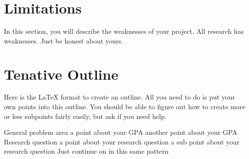 \documentclass{turabian-researchpaper}
\begin{document}
\section{Limitations}
In this section, you will describe the weaknesses of your project. All research has weaknesses. Just be honest about yours.

\section{Tenative Outline}
Here is the \LaTeX{} format to create an outline. All you need to do is put your own points into this outline. You should be able to figure out how to create more or less subpoints fairly easily, but ask if you need help.

\begin{outline}
\1 General problem area
    \2 a point about your GPA
    \2 another point about your GPA
\1 Research question
    \2 a point about your research question
        \3 a sub point about your research question
\1 Just continue on in this same pattern
\end{outline}






\clearpage
\printbibliography
\end{document}
